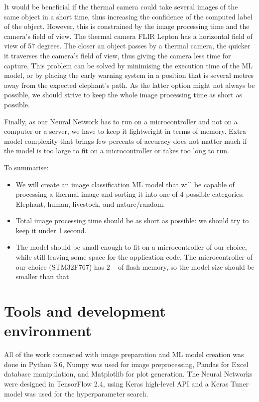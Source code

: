 It would be beneficial if the thermal camera could take several images of the same object in a short time, thus increasing the confidence of the computed label of the object.
However, this is constrained by the image processing time and the camera's field of view.
The thermal camera FLIR Lepton has a horizontal field of view of 57 degrees.
The closer an object passes by a thermal camera, the quicker it traverses the camera's field of view, thus giving the camera less time for capture.
This problem can be solved by minimising the execution time of the ML model, or by placing the early warning system in a position that is several metres away from the expected elephant's path.
As the latter option might not always be possible, we should strive to keep the whole image processing time as short as possible.

Finally, as our Neural Network has to run on a microcontroller and not on a computer or a server, we have to keep it lightweight in terms of memory.
Extra model complexity that brings few percents of accuracy does not matter much if the model is too large to fit on a microcontroller or takes too long to run.

To summarise:

\begin{itemize}
    \item We will create an image classification ML model that will be capable of processing a thermal image and sorting it into one of 4 possible categories: Elephant, human, livestock, and nature/random.
    \item Total image processing time should be as short as possible: we should try to keep it under 1 second.
    \item The model should be small enough to fit on a microcontroller of our choice, while still leaving some space for the application code. The microcontroller of our choice (STM32F767) has 2 \si{\mega\byte} of flash memory, so the model size should be smaller than that.
\end{itemize}


\section{ Tools and development environment}

All of the work connected with image preparation and ML model creation was done in Python 3.6, Numpy was used for image preprocessing, Pandas for Excel database manipulation, and Matplotlib for plot generation.
The Neural Networks were designed in TensorFlow 2.4, using Keras high-level API and a Keras Tuner model was used for the hyperparameter search.

